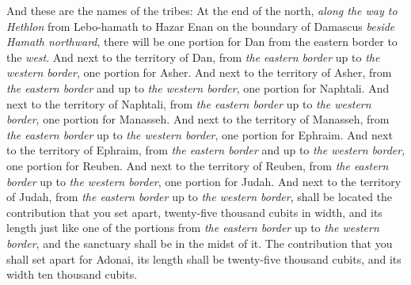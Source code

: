 \begin{biblechapter} %
 And these are the names of the tribes: At the end of the north, \textit{along the way to Hethlon} from Lebo-hamath to Hazar Enan on the boundary of Damascus \textit{beside Hamath northward}, there will be one portion for Dan from the eastern border to the \textit{west}.
\verse And next to the territory of Dan, from \textit{the eastern border} up to \textit{the western border}, one portion for Asher.
\verse And next to the territory of Asher, from \textit{the eastern border} and up to \textit{the western border}, one portion for Naphtali.
\verse And next to the territory of Naphtali, from \textit{the eastern border} up to \textit{the western border}, one portion for Manasseh.
\verse And next to the territory of Manasseh, from \textit{the eastern border} up to \textit{the western border}, one portion for Ephraim.
\verse And next to the territory of Ephraim, from \textit{the eastern border} and up to \textit{the western border}, one portion for Reuben.
\verse And next to the territory of Reuben, from \textit{the eastern border} up to \textit{the western border}, one portion for Judah.
\verse And next to the territory of Judah, from \textit{the eastern border} up to \textit{the western border}, shall be located the contribution that you set apart, twenty-five thousand cubits in width, and its length just like one of the portions from \textit{the eastern border} up to \textit{the western border}, and the sanctuary shall be in the midst of it.
\verse The contribution that you shall set apart for Adonai, its length shall be twenty-five thousand cubits, and its width ten thousand cubits.

\end{biblechapter}
